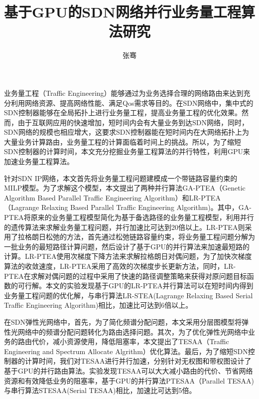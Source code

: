 \documentclass[master]{thesis-uestc}
\title{基于GPU的SDN网络并行业务量工程算法研究}
\author{张骞}
\begin{document}
\begin{chineseabstract}
业务量工程（Traffic Engineering）能够通过为业务选择合理的网络路由来达到充分利用网络资源、提高网络性能、满足Qos需求等目的。在SDN网络中，集中式的SDN控制器能够在全局拓扑上进行业务量工程，提高业务量工程的优化效果。然而，由于互联网应用的快速增加，短时间内会有大量业务到达SDN网络，同时，SDN网络的规模也相应增大，这要求SDN控制器能在短时间内在大网络拓扑上为大量业务计算路由，业务量工程的计算面临着时间上的挑战。所以，为了缩短SDN控制器的计算时间，本文充分挖掘业务量工程算法的并行特性，利用GPU来加速业务量工程算法。

针对SDN IP网络，本文首先将业务量工程问题建模成一个带链路容量约束的MILP模型。为了求解这个模型，本文提出了两种并行算法GA-PTEA（Genetic Algorithm Based Parallel Traffic Engineering Algorithm）和LR-PTEA（Lagrange Relaxing Based Parallel Traffic Engineering Algorithm)。其中，GA-PTEA将原来的业务量工程模型简化为基于备选路径的业务量工程模型，利用并行的遗传算法来求解业务量工程问题，并行加速比可达到20倍以上。LR-PTEA则采用了拉格朗日松弛的方法，首先通过松弛链路容量约束，将业务量工程问题分解为一批业务的最短路径计算问题，然后设计了基于GPU的并行算法来加速最短路的计算。LR-PTEA使用次梯度下降方法来求解拉格朗日对偶问题，为了加快次梯度算法的收敛速度，LR-PTEA采用了高效的次梯度步长更新方法，同时，LR-PTEA在求解对偶问题的过程中采用了快速的路径调整策略来获得对原问题目标函数的可行解。本文的实验发现基于GPU的LR-PTEA并行算法可以在短时间内得到业务量工程问题的优化解，与串行算法LR-STEA(Lagrange Relaxing Based Serial Traffic Engineering Algorithm)相比，加速比可达到6倍以上。

在SDN弹性光网络中，首先，为了简化频谱分配问题，本文采用分层图模型将弹性光网络中的频谱分配问题转化为路由选择问题。其次，为了优化弹性光网络中业务的路由代价，减小资源使用，降低阻塞率，本文提出了TESAA（Traffic Engineering and Spectrum Allocate Algrithm）优化算法。最后，为了缩短SDN控制器的计算时间，我们对TESAA进行并行加速，分别针对无权图和带权图设计了基于GPU的并行路由算法。实验发现TESAA可以大大减小路由的代价、节省网络资源和有效降低业务的阻塞率，基于GPU的并行算法PTESAA（Parallel TESAA)与串行算法STESAA(Serial TESAA)相比，加速比可达到5倍。

\end{chineseabstract}
\end{document}
